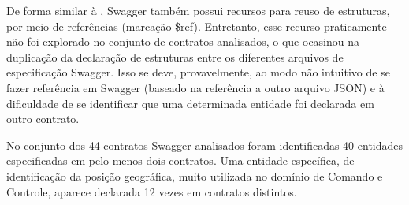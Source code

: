 De forma similar à \neoidl{}, Swagger também possui recursos para reuso de
estruturas, por meio de referências (marcação \$ref). Entretanto, esse recurso
praticamente não foi explorado no conjunto de contratos analisados, o que
ocasinou na duplicação da declaração de estruturas entre os diferentes arquivos
de especificação Swagger. Isso se deve, provavelmente, ao modo não intuitivo de
se fazer referência em Swagger (baseado na referência a outro arquivo JSON) e à
dificuldade de se identificar que uma determinada entidade foi declarada em
outro contrato.

No conjunto dos 44 contratos Swagger analisados foram identificadas 40 entidades
especificadas em pelo menos dois contratos. Uma entidade específica, de
identificação da posição geográfica, muito utilizada no domínio de Comando e Controle, aparece
declarada 12 vezes em contratos distintos.

